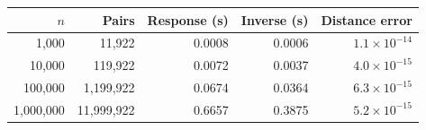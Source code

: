 \begin{tabular}{rrrrr}
\toprule
$n$ & Pairs & Response (s) & Inverse (s) & Distance error \\
\midrule
1,000 & 11,922 & 0.0008 & 0.0006 & $1.1\times10^{-14}$ \\
10,000 & 119,922 & 0.0072 & 0.0037 & $4.0\times10^{-15}$ \\
100,000 & 1,199,922 & 0.0674 & 0.0364 & $6.3\times10^{-15}$ \\
1,000,000 & 11,999,922 & 0.6657 & 0.3875 & $5.2\times10^{-15}$ \\
\bottomrule
\end{tabular}
